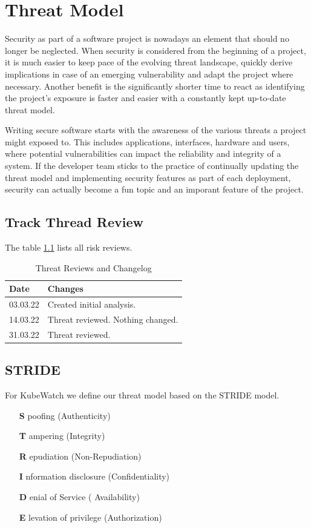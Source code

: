 \chapter{Threat Model}

Security as part of a software project is nowadays an element that should no longer be neglected. When security is considered from the beginning of a project, it is much easier to keep pace of the evolving threat landscape, quickly derive implications in case of an emerging vulnerability and adapt the project where necessary. Another benefit is the significantly shorter time to react as identifying the project's exposure is faster and easier with a constantly kept up-to-date threat model.

Writing secure software starts with the awareness of the various threats a project might exposed to. This includes applications, interfaces, hardware and users, where potential vulnerabilities can impact the reliability and integrity of a system. If the developer team sticks to the practice of continually updating the threat model and implementing security features as part of each deployment, security can actually become a fun topic and an imporant feature of the project.

\section{Track Thread Review}
The table \ref{tab:threat-review} lists all risk reviews.

\begin{table}[h!]
  \centering
  \caption{\label{tab:threat-review}Threat Reviews and Changelog}
  \begin{tabular}{ | l | l | }
    \hline
    \textbf{Date} & \textbf{Changes} \\
    \hline
    03.03.22 & Created initial analysis. \\
    \hline
    14.03.22 & Threat reviewed. Nothing changed. \\
    \hline
    31.03.22 & Threat reviewed. \\
    \hline
  \end{tabular}
\end{table}

\section{STRIDE}

For KubeWatch we define our threat model based on the STRIDE model.
\begin{itemize}
    \item [{\bfseries S}]poofing (Authenticity)
    \item [{\bfseries T}]ampering (Integrity)
    \item [{\bfseries R}]epudiation (Non-Repudiation)
    \item [{\bfseries I}]nformation disclosure (Confidentiality)
    \item [{\bfseries D}]enial of Service ( Availability)
    \item [{\bfseries E}]levation of privilege (Authorization)
\end{itemize}


